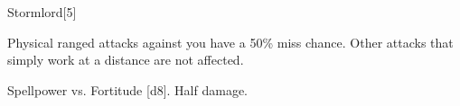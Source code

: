 \begin{spellsection}{Stormlord}[5]
    \begin{spellheader}
    \end{spellheader}
    \begin{spellcontent}
        \begin{spelltargetinginfo}
        \end{spelltargetinginfo}
        \begin{spelleffects}
            \spelleffect Physical ranged attacks against you have a 50\% miss chance. Other attacks that simply work at a distance are not affected.
            \spelldur \durshort
        \end{spelleffects}
    \end{spellcontent}
    \begin{spellsubcontent}
        \begin{spelltargetinginfo}
        \end{spelltargetinginfo}
        \begin{spelleffects}
            \begin{spellattack}{Spellpower vs. Fortitude}
                \spellsuccess {}[d8].
                \spellfailure Half damage.
            \end{spellattack}
        \end{spelleffects}
    \end{spellsubcontent}
    \begin{spellfooter}
        \miscastexplode
    \end{spellfooter}
\end{spellsection}

